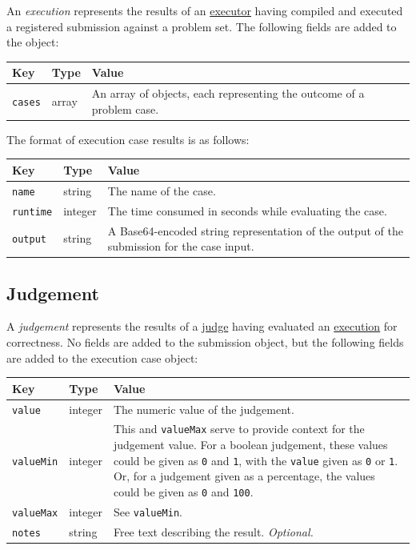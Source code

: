 \documentclass[11pt,letterpaper]{article}
\begin{document}
An \emph{execution} represents the results of an
\hyperref[design-executor-judge]{executor} having compiled and executed a
registered submission against a problem set. The following fields are added to
the object:

\nopagebreak
\begin{tabulary}{\textwidth}{ | l | l | L | }
    \hline
    \textbf{Key} & \textbf{Type} & \textbf{Value} \\
    \hline
    \texttt{cases} & array & An array of objects, each representing the outcome
        of a problem case. \\
    \hline
\end{tabulary}

The format of execution case results is as follows:

\nopagebreak
\begin{tabulary}{\textwidth}{ | l | l | L | }
    \hline
    \textbf{Key} & \textbf{Type} & \textbf{Value} \\
    \hline
    \texttt{name} & string & The name of the case. \\
    \hline
    \texttt{runtime} & integer & The time consumed in seconds while evaluating
        the case. \\
    \hline
    \texttt{output} & string & A Base64-encoded string representation of the
        output of the submission for the case input. \\
    \hline
\end{tabulary}

\subsection{Judgement}
\label{formats-judge}

A \emph{judgement} represents the results of a
\hyperref[design-executor-judge]{judge} having evaluated an
\hyperref[formats-exec]{execution} for correctness. No fields are added to
the submission object, but the following fields are added to the execution case
object:

\nopagebreak
\begin{tabulary}{\textwidth}{ | l | l | L | }
    \hline
    \textbf{Key} & \textbf{Type} & \textbf{Value} \\
    \hline
    \texttt{value} & integer & The numeric value of the judgement. \\
    \hline
    \texttt{valueMin} & integer & This and \texttt{valueMax} serve to provide
        context for the judgement value. For a boolean judgement, these values
        could be given as \texttt{0} and \texttt{1}, with the \texttt{value}
        given as \texttt{0} or \texttt{1}. Or, for a judgement given as a
        percentage, the values could be given as \texttt{0} and \texttt{100}.
        \\
    \hline
    \texttt{valueMax} & integer & See \texttt{valueMin}. \\
    \hline
    \texttt{notes} & string & Free text describing the result.
        \emph{Optional.} \\
    \hline
\end{tabulary}
\end{document}
